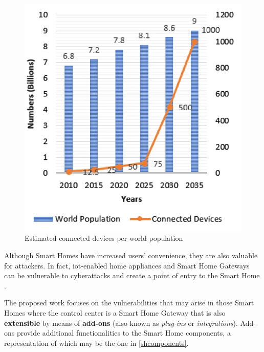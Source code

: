     \begin{figure}[H]
        \centering
        \includegraphics[scale=0.25]{images/introduction/devices_human.jpg}
        \caption{Estimated connected devices per world population \cite{touqeer2021smart}}
        \label{globaltrend}
    \end{figure}

Although Smart Homes have increased users' convenience, they are also valuable for attackers. In fact, \gls{iot}-enabled home appliances and Smart Home Gateways can be vulnerable to cyberattacks and create a point of entry to the Smart Home \cite{ray2020iot}.


The proposed work focuses on the vulnerabilities that may arise in those Smart Homes where the control center is a Smart Home Gateway that is also \textbf{extensible} by means of \textbf{add-ons} (also known as \textit{plug-ins} or \textit{integrations}). Add-ons provide additional functionalities to the Smart Home components, a representation of which may be the one in \autoref{shcomponents}.

